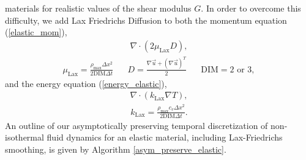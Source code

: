 \documentclass[]{article}
\begin{document}
materials for realistic values of the shear modulus $G$.  
In order to overcome 
this difficulty, we add Lax Friedrichs Diffusion\cite{Lax1954} 
to both the momentum equation (\ref{elastic_mom}),
\begin{eqnarray}
\nabla\cdot (2\mu_{\mbox{Lax}}D),
\end{eqnarray}
\begin{eqnarray}
\mu_{\mbox{Lax}}=\frac{\rho_{\mbox{max}}\Delta x^{2}}{2\mbox{DIM}\Delta t}
\hspace{20pt} D=\frac{\nabla\vec{u}+(\nabla\vec{u})^{T}}{2} \hspace{20pt}
\mbox{DIM}=2 \mbox{ or } 3,
\end{eqnarray}
and the energy equation (\ref{energy_elastic}),
\begin{eqnarray}
\nabla\cdot (k_{\mbox{Lax}}\nabla T),
\end{eqnarray}
\begin{eqnarray}
k_{\mbox{Lax}}=\frac{\rho_{\mbox{max}}c_{v}\Delta x^{2}}{2\mbox{DIM}\Delta t}.
\end{eqnarray}
An outline of our asymptotically preserving
temporal discretization of non-isothermal fluid dynamics for an 
elastic material,
including Lax-Friedrichs smoothing, is given by 
Algorithm \ref{asym_preserve_elastic}.
\end{document}
